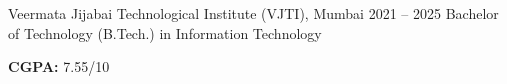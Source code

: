 



%
\EducationEntry
  {Veermata Jijabai Technological Institute (VJTI), Mumbai}%
  {2021 -- 2025}%
  {Bachelor of Technology (B.Tech.) in Information Technology}%


\ifShowCGPA
  \vspace{1pt}
  \textbf{CGPA:} 7.55/10%
  \vspace{2pt}
\fi


%
%


